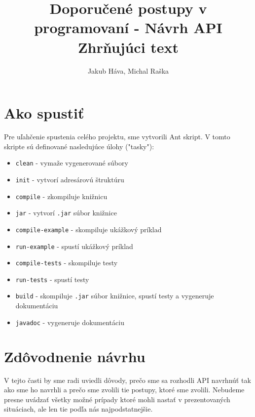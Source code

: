 \documentclass{article}
\title{\vspace{30mm}Doporučené postupy v programovaní - Návrh API\\Zhrňujúci text}
\author{Jakub Háva, Michal Raška}
\date{}
\begin{document}
\maketitle
\thispagestyle{empty}

\clearpage
\tableofcontents

\clearpage
\section{Ako spustiť}
Pre uľahčenie spustenia celého projektu, sme vytvorili Ant skript. V tomto skripte sú definované nasledujúce úlohy ("tasky"):
\begin{itemize}
    \item \texttt{clean} - vymaže vygenerované súbory
    \item \texttt{init} - vytvorí adresárovú štruktúru
    \item \texttt{compile} - zkompiluje knižnicu
    \item \texttt{jar} - vytvorí \texttt{.jar} súbor knižnice
    \item \texttt{compile-example} - skompiluje ukážkový príklad
    \item \texttt{run-example} - spustí ukážkový príklad
    \item \texttt{compile-tests} - skompiluje testy
    \item \texttt{run-tests} - spustí testy
    \item \texttt{build} - skompiluje \texttt{.jar} súbor knižnice, spustí testy a vygeneruje dokumentáciu
    \item \texttt{javadoc} - vygeneruje dokumentáciu
\end{itemize}

\clearpage
\section{Zdôvodnenie návrhu}
V tejto časti by sme radi uviedli dôvody, prečo sme sa rozhodli API navrhnúť tak ako sme ho navrhli a prečo sme zvolili tie postupy, ktoré sme zvolili. Nebudeme presne uvádzať všetky možné prípady ktoré mohli nastať v prezentovaných situáciach, ale len tie podľa nás najpodstatnejšie.
\end{document}
